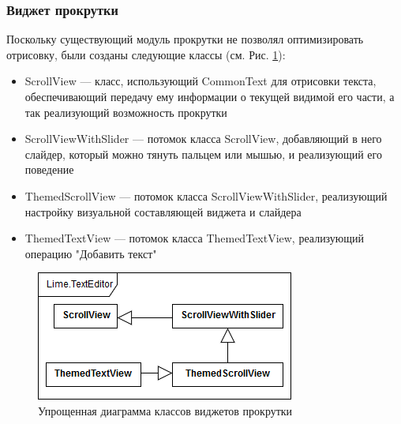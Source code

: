 \documentclass{fefu}
\begin{document}
			\subsubsection{Виджет прокрутки}
				\par Поскольку существующий модуль прокрутки не позволял оптимизировать
				отрисовку, были созданы следующие классы (см. Рис. \ref{diag:ScrollView}):
				\begin{itemize}
					\item ScrollView --- класс, использующий CommonText для отрисовки текста,
					обеспечивающий передачу ему информации о текущей видимой его части, а так
					реализующий возможность прокрутки
					\item ScrollViewWithSlider --- потомок класса ScrollView, добавляющий в 
					него слайдер, который можно тянуть пальцем или мышью, и реализующий его
					поведение
					\item ThemedScrollView --- потомок класса ScrollViewWithSlider,
					реализующий настройку визуальной составляющей виджета и слайдера
					\item ThemedTextView --- потомок класса ThemedTextView, реализующий 
					операцию "Добавить текст"
				\end{itemize}
				\begin{figure}[H]
					\centering
					\includegraphics[width=0.7\linewidth]{diagrams/ScrollView.png}
					\caption{Упрощенная диаграмма классов виджетов прокрутки}
					\label{diag:ScrollView}
				\end{figure}
\end{document}
